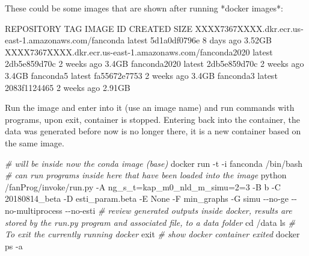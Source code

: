 \documentclass[
]{book}
\newenvironment{Shaded}{\begin{snugshade}}{\end{snugshade}}
\newcommand{\BuiltInTok}[1]{#1}
\newcommand{\CommentTok}[1]{\textcolor[rgb]{0.56,0.35,0.01}{\textit{#1}}}
\newcommand{\ExtensionTok}[1]{#1}
\newcommand{\FunctionTok}[1]{\textcolor[rgb]{0.00,0.00,0.00}{#1}}
\newcommand{\NormalTok}[1]{#1}
\begin{document}
\begin{Shaded}
\begin{Highlighting}[]
\ExtensionTok{These}\NormalTok{ could be some images that are shown after running *docker images*:}

\ExtensionTok{REPOSITORY}\NormalTok{                                                     TAG                 IMAGE ID            CREATED             SIZE}
\ExtensionTok{XXXX7367XXXX.dkr.ecr.us{-}east{-}1.amazonaws.com/fanconda}\NormalTok{       latest              5d1a0df0796e        8 days ago          3.52GB}
\ExtensionTok{XXXX7367XXXX.dkr.ecr.us{-}east{-}1.amazonaws.com/fanconda2020}\NormalTok{   latest              2db5e859d70c        2 weeks ago         3.4GB}
\ExtensionTok{fanconda2020}\NormalTok{                                                latest              2db5e859d70c        2 weeks ago         3.4GB}
\ExtensionTok{fanconda5}\NormalTok{                                                   latest              fa55672e7753        2 weeks ago         3.4GB}
\ExtensionTok{fanconda3}\NormalTok{                                                   latest              2083f1124465        2 weeks ago         2.91GB}
\end{Highlighting}
\end{Shaded}

Run the image and enter into it (use an image name) and run commands with programs, upon exit, container is stopped. Entering back into the container, the data was generated before now is no longer there, it is a new container based on the same image.

\begin{Shaded}
\begin{Highlighting}[]
\CommentTok{\# will be inside now the conda image (base)}
\ExtensionTok{docker}\NormalTok{ run {-}t {-}i fanconda /bin/bash}
\CommentTok{\# can run programs inside here that have been loaded into the image}
\ExtensionTok{python}\NormalTok{ /fanProg/invoke/run.py {-}A ng\_s\_t=kap\_m0\_nld\_m\_simu=2=3 {-}B b {-}C 20180814\_beta {-}D esti\_param.beta {-}E None {-}F min\_graphs {-}G simu {-}{-}no{-}ge {-}{-}no{-}multiprocess {-}{-}no{-}esti}
\CommentTok{\# review generated outputs inside docker, results are stored by the run.py program and associated file, to a data folder}
\BuiltInTok{cd}\NormalTok{ /data}
\FunctionTok{ls}
\CommentTok{\# To exit the currently running docker}
\BuiltInTok{exit}
\CommentTok{\# show docker container exited}
\ExtensionTok{docker}\NormalTok{ ps {-}a}
\end{Highlighting}
\end{Shaded}
\end{document}
